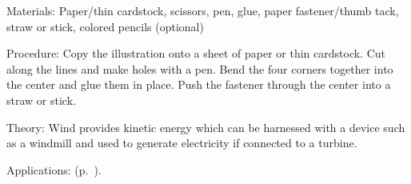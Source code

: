 \begin{multicols}{2}
\begin{description*}
\item[Materials:]{Paper/thin cardstock, scissors, pen, glue, paper fastener/thumb tack, straw or stick, colored pencils (optional)}
\item[Procedure:]{Copy the illustration onto a sheet of paper or thin cardstock. Cut along the lines and make holes with a pen. Bend the four corners together into the center and glue them in place. Push the fastener through the center into a straw or stick.}
\item[Theory:]{Wind provides kinetic energy which can be harnessed with a device such as a windmill and used to generate electricity if connected to a turbine.}
\item[Applications:]{ (p.~\pageref{sub:wind-turbine}).}
\end{description*}




\end{multicols}

\pagebreak